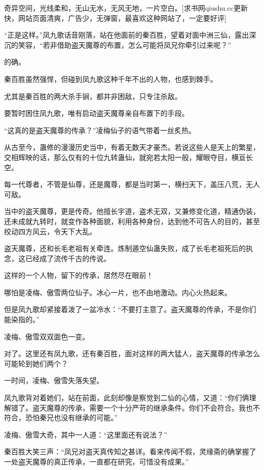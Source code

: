 
\begin{this_body}

奇异空间，光线柔和，无山无水，无风无地，一片空白。[求书网qiushu.cc更新快，网站页面清爽，广告少，无弹窗，最喜欢这种网站了，一定要好评]

“正是这样。”凤九歌话音刚落，站在他面前的秦百胜，望着对面中洲三仙，露出深沉的笑容，“若非借助盗天魔尊的布置，怎么可能将凤兄你牵引过来呢？”

的确。

秦百胜虽然强悍，但碰到凤九歌这种千年不出的人物，也感到棘手。

尤其是秦百胜的两大杀手锏，都并非困敌，只专注杀敌。

要暂时困住凤九歌，唯有启动盗天魔尊亲自布置下的手段。

“这真的是盗天魔尊的传承？”凌梅仙子的语气带着一丝炙热。

从古至今，蛊修的漫漫历史当中，有着无数天才豪杰。若说这些人是天上的繁星，交相辉映的话，那么仅有的十位九转蛊仙，就宛若太阳一般，耀眼夺目，横亘长空。

每一代尊者，不管是仙尊，还是魔尊，都是当时第一，横扫天下，盖压八荒，无人可敌。

当中的盗天魔尊，更是传奇。他擅长宇道，盗术无双，又兼修变化道，精通伪装，还未成就九转时，就变作各种面貌，利用各种身份，达到他不可告人的目的，甚至绞动四方风云，令天下大乱。

盗天魔尊，还和长毛老祖有关牵连。炼制遁空仙蛊失败，成了长毛老祖死后的执念，这已经成了流传千古的传说。

这样的一个人物，留下的传承，居然尽在眼前！

哪怕是凌梅、傲雪两位仙子。冰心一片，也不由地激动。内心火热起来。

但是凤九歌却紧接着泼了一盆冷水：“不要打主意了。盗天魔尊的传承，不是你们能染指的。”

凌梅、傲雪双双面色一变。

对了。这里还有凤九歌，还有秦百胜，面对这样的两大猛人，盗天魔尊的传承怎么可能轮到她们两个？

一时间，凌梅、傲雪失落失望。

凤九歌背对着她们，站在前面，此刻却像是察觉到二仙的心情，又道：“你们俩理解错了。盗天魔尊的传承，需要一个十分严苛的继承条件。你们不会符合。我也不符合，恐怕秦兄也没有继承的可能。”

凌梅、傲雪大奇，其中一人道：“这里面还有说法？”

秦百胜大笑三声：“凤兄对盗天真传知之甚详。看来传闻不假，灵缘斋的确掌握了一处盗天魔尊的真正传承，一直都在研究，可惜没有成果。”


\end{this_body}
